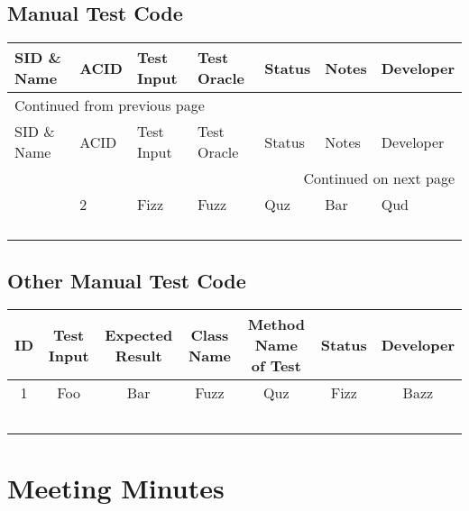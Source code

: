 \documentclass[11pt]{article}
\begin{document}
\subsection{Manual Test Code}
\label{sec:orgc3d6aeb}
\begin{longtable}{|l|l||p{2.5cm}|p{2.5cm}|l|l|l|}
SID \& Name & ACID & Test Input & Test Oracle & Status & Notes & Developer\\
\hline
\endfirsthead
\multicolumn{7}{l}{Continued from previous page} \\
\hline

SID \& Name & ACID & Test Input & Test Oracle & Status & Notes & Developer \\

\hline
\endhead
\hline\multicolumn{7}{r}{Continued on next page} \\
\endfoot
\endlastfoot
\hline
1 & 2 & Fizz & Fuzz & Quz & Bar & Qud\\
 &  &  &  &  &  & \\
 &  &  &  &  &  & \\
 &  &  &  &  &  & \\
 &  &  &  &  &  & \\
\end{longtable}
\subsection{Other Manual Test Code}
\label{sec:org50426e2}
\small
\begin{center}
\begin{tabular}{|c|c|c|c|c|c|c|}
ID & Test Input & Expected Result & Class Name & Method Name of Test & Status & Developer\\
\hline
1 & Foo & Bar & Fuzz & Quz & Fizz & Bazz\\
 &  &  &  &  &  & \\
 &  &  &  &  &  & \\
 &  &  &  &  &  & \\
 &  &  &  &  &  & \\
 &  &  &  &  &  & \\
\end{tabular}
\end{center}
\normalsize

\section{Meeting Minutes}
\label{sec:org71a552c}
\end{document}
